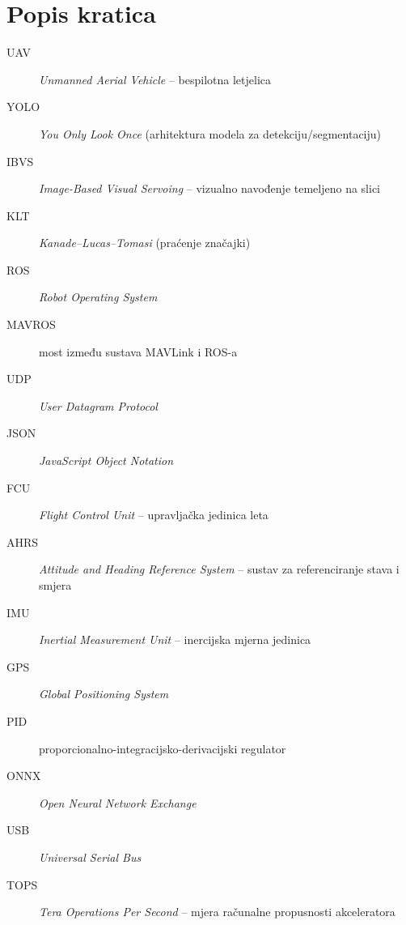 \documentclass[12pt,a4paper]{report}
\begin{document}
\chapter*{Popis kratica}
\thispagestyle{empty}
\begin{description}
  \item[UAV] \emph{Unmanned Aerial Vehicle} -- bespilotna letjelica
  \item[YOLO] \emph{You Only Look Once} (arhitektura modela za detekciju/segmentaciju)
  \item[IBVS] \emph{Image-Based Visual Servoing} -- vizualno navođenje temeljeno na slici
  \item[KLT] \emph{Kanade--Lucas--Tomasi} (praćenje značajki)
  \item[ROS] \emph{Robot Operating System}
  \item[MAVROS] most između sustava MAVLink i ROS-a
  \item[UDP] \emph{User Datagram Protocol}
  \item[JSON] \emph{JavaScript Object Notation}
  \item[FCU] \emph{Flight Control Unit} -- upravljačka jedinica leta
  \item[AHRS] \emph{Attitude and Heading Reference System} -- sustav za referenciranje stava i smjera
  \item[IMU] \emph{Inertial Measurement Unit} -- inercijska mjerna jedinica
  \item[GPS] \emph{Global Positioning System}
  \item[PID] proporcionalno-integracijsko-derivacijski regulator
  \item[ONNX] \emph{Open Neural Network Exchange}
  \item[USB] \emph{Universal Serial Bus}
  \item[TOPS] \emph{Tera Operations Per Second} -- mjera računalne propusnosti akceleratora
\end{description}

\newpage

\tableofcontents
\thispagestyle{empty}

\newpage

\pagestyle{plain}
\end{document}

